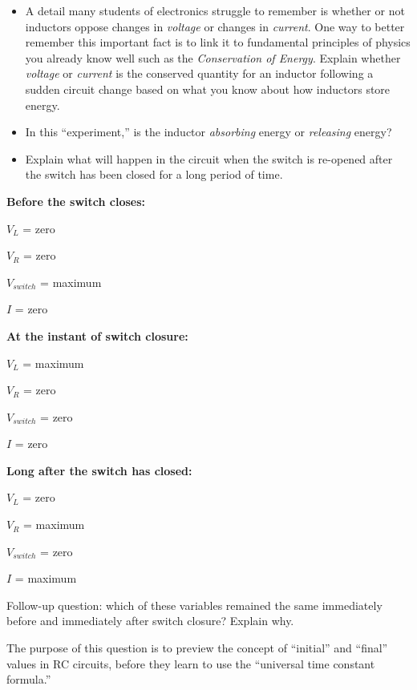\begin{itemize}
\item{} A detail many students of electronics struggle to remember is whether or not inductors oppose changes in {\it voltage} or changes in {\it current}.  One way to better remember this important fact is to link it to fundamental principles of physics you already know well such as the {\it Conservation of Energy}.  Explain whether {\it voltage} or {\it current} is the conserved quantity for an inductor following a sudden circuit change based on what you know about how inductors store energy.
\item{} In this ``experiment,'' is the inductor {\it absorbing} energy or {\it releasing} energy?
\item{} Explain what will happen in the circuit when the switch is re-opened after the switch has been closed for a long period of time.
\end{itemize}







\noindent
{\bf Before the switch closes:}

$V_{L}$ = zero

$V_{R}$ = zero

$V_{switch}$ = maximum

$I$ = zero

\vskip 10pt
\goodbreak

\noindent
{\bf At the instant of switch closure:}

$V_{L}$ = maximum

$V_{R}$ = zero

$V_{switch}$ = zero

$I$ = zero

\vskip 10pt
\goodbreak

\noindent
{\bf Long after the switch has closed:}

$V_{L}$ = zero

$V_{R}$ = maximum

$V_{switch}$ = zero

$I$ = maximum

\vskip 10pt

Follow-up question: which of these variables remained the same immediately before and immediately after switch closure?  Explain why.







The purpose of this question is to preview the concept of ``initial'' and ``final'' values in RC circuits, before they learn to use the ``universal time constant formula.''




